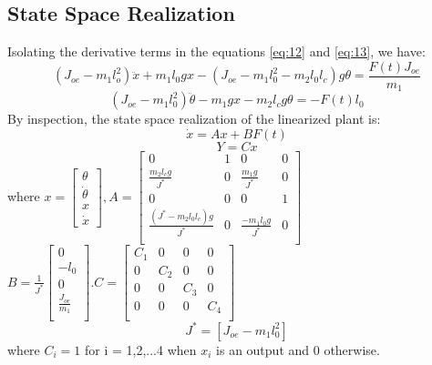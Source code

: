 \documentclass[12pt, a4paper]{article}
\begin{document}
\subsection{State Space Realization}
Isolating the derivative terms in the equations \eqref{eq:12} and \eqref{eq:13}, we have:
\begin{equation}\label{eq:14}
(J_{oe} - m_1l_o^2)\ddot{x} + m_1l_0gx - (J_{oe} -m_1l_0^2 -m_2l_0l_c)g\theta = \frac{F(t)J_{oe}}{m_1}
\end{equation}
\begin{equation}\label{eq:15}
(J_{oe} - m_1l_0^2)\ddot{\theta} - m_1gx -m_2l_cg\theta = -F(t)l_0
\end{equation}
By inspection, the state space realization of the linearized plant is:
\begin{equation}\label{eq:16}
\dot{x} = Ax + BF(t)
\end{equation}
\begin{equation}\label{eq:17}
Y = Cx
\end{equation}
where $x = 
\begin{bmatrix}
\theta \\
\dot{\theta}\\
x \\
\dot{x}
\end{bmatrix}
, A =
\begin{bmatrix}
0 & 1 & 0 & 0\\
\frac{m_2l_cg}{J^*} & 0 & \frac{m_1g}{J^*} & 0 \\
0 & 0 & 0 & 1 \\
\frac{(J^* - m_2l_0l_c)g}{J^*} & 0 &  \frac{-m_1l_0g}{J^*} & 0\\
\end{bmatrix}$  \\
$ B = \frac{1}{J^*} \begin{bmatrix}
0 \\
-l_0 \\
0 \\
\frac{J_{oe}}{m_1}\\
\end{bmatrix}. C = \begin{bmatrix}
C_1 & 0 & 0 & 0 \\
0 & C_2 & 0 & 0 \\
0 & 0 & C_3 & 0 \\
0 & 0 & 0 & C_4 \\
\end{bmatrix}$
\begin{equation}\label{eq:18}
J^* = [J_{oe} - m_1l_0^2]
\end{equation}
where $C_i = 1$ for i = 1,2,...4 when $x_i$ is an output and 0 otherwise.
\end{document}
